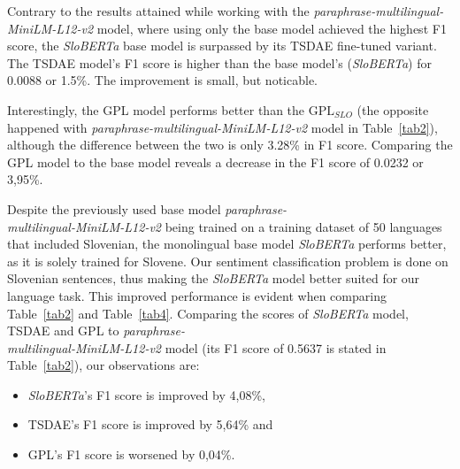 \documentclass[fleqn,moreauthors,10pt]{ds_report}
\begin{document}
Contrary to the results attained while working with the {\it paraphrase-multilingual-MiniLM-L12-v2} model, where using only the base model achieved the highest F1 score, the {\it SloBERTa} base model is surpassed by its TSDAE fine-tuned variant. The TSDAE model's F1 score is higher than the base model's ({\it SloBERTa}) for 0.0088 or 1.5\%. The improvement is small, but noticable.

Interestingly, the GPL model performs better than the $\text{GPL}_{SLO}$ (the opposite happened with {\it paraphrase-multilingual-MiniLM-L12-v2} model in Table~\ref{tab2}), although the difference between the two is only 3.28\% in F1 score. %
Comparing the GPL model to the base model reveals a decrease in the F1 score of 0.0232 or 3,95\%.

Despite the previously used base model {\it paraphrase-\\multilingual-MiniLM-L12-v2} being trained on a training dataset of 50 languages that included Slovenian, the monolingual base model {\it SloBERTa} performs better, as it is solely trained for Slovene. Our sentiment classification problem is done on Slovenian sentences, thus making the {\it SloBERTa} model better suited for our language task. This improved performance is evident when comparing Table~\ref*{tab2} and Table~\ref*{tab4}. Comparing the scores of {\it SloBERTa} model, TSDAE and GPL to {\it paraphrase-\\multilingual-MiniLM-L12-v2} model (its F1 score of 0.5637 is stated in Table~\ref{tab2}), our observations are:
\begin{itemize}
	\item {\it SloBERTa}'s F1 score is improved by 4,08\%,
	\item TSDAE's F1 score is improved by 5,64\% and
	\item GPL's F1 score is worsened by 0,04\%.
\end{itemize}
\end{document}
